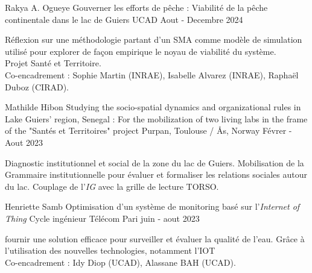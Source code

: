 \begin{cventries}
    \cventry
        {Rakya A. Ogueye} %
        {Gouverner les efforts de pêche : Viabilité de la pêche continentale dans le lac de Guiers} %
        {UCAD } %
        {Aout - Decembre 2024} %
        {
        \begin{cvitems} %
            Réflexion sur une méthodologie partant d’un SMA comme modèle de simulation utilisé pour explorer de façon empirique le noyau de viabilité du système.\\
            Projet Santé et Territoire.\\
            Co-encadrement : Sophie Martin (INRAE), Isabelle Alvarez (INRAE), Raphaël Duboz (CIRAD).
        \end{cvitems}
        }


    \cventry
        {Mathilde Hibon} %
        {Studying the socio-spatial dynamics and organizational rules in Lake Guiers' region, Senegal : For the mobilization of two living labs in the frame of the "Santés et Territoires" project} %
        {Purpan, Toulouse /  Ås, Norway} %
        {Févrer - Aout 2023} %
        {
        \begin{cvitems} %
          Diagnostic institutionnel et social de la zone du lac de Guiers. Mobilisation de la Grammaire institutionnelle pour évaluer et formaliser les relations sociales autour du lac. Couplage de l'\textit{IG} avec la grille de lecture TORSO. 
        \end{cvitems}
        }


    \cventry
        {Henriette Samb} %
        {Optimisation d’un système de monitoring basé sur l’\textit{Internet of Thing}} %
        {Cycle ingénieur Télécom Pari } %
        {juin - aout 2023} %
        {
        \begin{cvitems} %
          fournir une solution efficace pour surveiller et évaluer la qualité de l’eau. Grâce à l’utilisation des nouvelles technologies, notamment l’IOT\\
            Co-encadrement : Idy Diop (UCAD), Alassane BAH (UCAD).
        \end{cvitems}
        }



\end{cventries}
